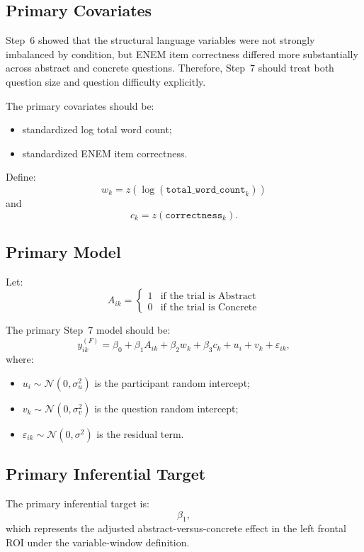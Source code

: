 \documentclass[11pt]{article}
\begin{document}
\subsection{Primary Covariates}
Step~6 showed that the structural language variables were not strongly imbalanced by condition,
but ENEM item correctness differed more substantially across abstract and concrete questions.
Therefore, Step~7 should treat both question size and question difficulty explicitly.

The primary covariates should be:
\begin{itemize}
    \item standardized log total word count;
    \item standardized ENEM item correctness.
\end{itemize}

Define:
\begin{equation}
w_k = z\!\left(\log(\texttt{total\_word\_count}_k)\right)
\end{equation}
and
\begin{equation}
c_k = z(\texttt{correctness}_k).
\end{equation}

\subsection{Primary Model}
Let:
\begin{equation}
A_{ik} =
\begin{cases}
1 & \text{if the trial is Abstract} \\
0 & \text{if the trial is Concrete}
\end{cases}
\end{equation}

The primary Step~7 model should be:
\begin{equation}
y^{(F)}_{ik}
=
\beta_0
+
\beta_1 A_{ik}
+
\beta_2 w_k
+
\beta_3 c_k
+
u_i
+
v_k
+
\varepsilon_{ik},
\end{equation}
where:
\begin{itemize}
    \item \(u_i \sim \mathcal{N}(0,\sigma_u^2)\) is the participant random intercept;
    \item \(v_k \sim \mathcal{N}(0,\sigma_v^2)\) is the question random intercept;
    \item \(\varepsilon_{ik} \sim \mathcal{N}(0,\sigma^2)\) is the residual term.
\end{itemize}

\subsection{Primary Inferential Target}
The primary inferential target is:
\begin{equation}
\beta_1,
\end{equation}
which represents the adjusted abstract-versus-concrete effect in the left frontal ROI under the
variable-window definition.
\end{document}
